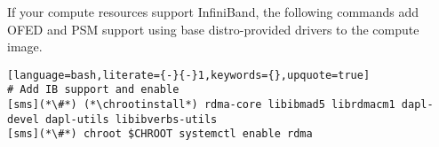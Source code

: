 If your compute resources support InfiniBand, the following commands add OFED
and PSM support using base distro-provided drivers to the compute
image. 

\begin{lstlisting}[language=bash,literate={-}{-}1,keywords={},upquote=true]
# Add IB support and enable
[sms](*\#*) (*\chrootinstall*) rdma-core libibmad5 librdmacm1 dapl-devel dapl-utils libibverbs-utils
[sms](*\#*) chroot $CHROOT systemctl enable rdma
\end{lstlisting}

